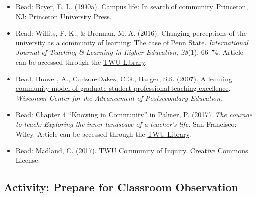 \documentclass[
]{book}
\providecommand{\tightlist}{%
  \setlength{\itemsep}{0pt}\setlength{\parskip}{0pt}}
\begin{document}
\begin{reflect}
\begin{itemize}
\tightlist
\item
  Read: Boyer, E. L. (1990a). \href{https://eric.ed.gov/?id=ED320492}{Campus life: In search of community}. Princeton, NJ: Princeton University Press.\\
\item
  Read: Willits, F. K., \& Brennan, M. A. (2016). Changing perceptions of the university as a community of learning: The case of Penn State. \emph{International Journal of Teaching \& Learning in Higher Education, 28}(1), 66--74. Article can be accessed through the \href{https://www.twu.ca/library/}{TWU Library}.\\
\item
  Read: Brower, A., Carlson-Dakes, C.G., Barger, S.S. (2007). \href{https://wiscape.wisc.edu/docs/wiscapedocuments/wp003.pdf?sfvrsn=8}{A learning community model of graduate student professional teaching excellence}. \emph{Wisconsin Center for the Advancement of Postsecondary Education}.\\
\item
  Read: Chapter 4 ``Knowing in Community'' in Palmer, P. (2017). \emph{The courage to teach: Exploring the inner landscape of a teacher's life.} San Francisco: Wiley. Article can be accessed through the \href{https://www.twu.ca/library/}{TWU Library}.\\
\item
  Read: Madland, C. (2017). \href{assets/u2/Madland-transformational-learning.pdf}{TWU Community of Inquiry}. Creative Commons License.
\end{itemize}
\end{reflect}

\hypertarget{activity-prepare-for-classroom-observation}{%
\subsection*{Activity: Prepare for Classroom Observation}\label{activity-prepare-for-classroom-observation}}
\end{document}
